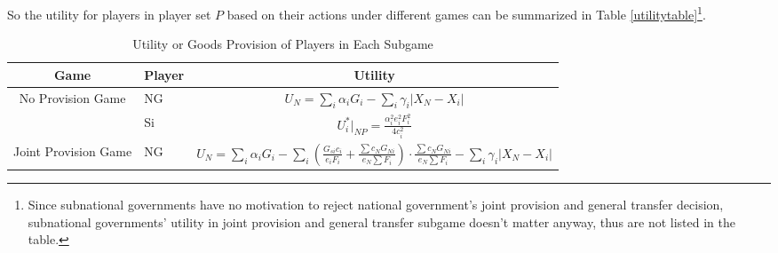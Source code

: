 \begin{itemize}
So the utility for players in player set $P$ based on their actions under different games can be summarized in Table \ref{utilitytable}\footnote{Since subnational governments have no motivation to reject national government's joint provision and general transfer decision, subnational governments' utility in joint provision and general transfer subgame doesn't matter anyway, thus are not listed in the table.}.
\begin{table}[htbp]
    \centering
    \caption{Utility or Goods Provision of Players in Each Subgame}
    \begin{tabular}{clc}
        \toprule
        \multicolumn{1}{p{11.645em}}{Game}                         & \multicolumn{1}{p{2.855em}}{Player}        & \multicolumn{1}{p{16.57em}}{Utility}                                                                                                                                       \\
        \midrule
        \multicolumn{1}{c}{\multirow{3}[4]{*}{No Provision Game }} & \multicolumn{1}{p{2.855em}}{NG}            & $U_N=\sum_i\alpha_i G_i-\sum_i \gamma_i |X_N-X_i|$                                                                                                                         \\
        \cmidrule{2-3}                                             & \multicolumn{1}{l}{\multirow{2}[2]{*}{Si}} & \multirow{2}[2]{*}{ $U_i^*|_{NP}=\frac{\alpha_i^2 e_i^2 F_i^2}{4c_i^2}$}                                                                                                   \\
                                                                   &                                            &                                                                                                                                                                            \\
        \midrule
        \multirow{3}[4]{*}{Joint Provision Game}                   & \multicolumn{1}{p{2.855em}}{NG}            & $ U_N= \sum_i \alpha_i G_i - \sum_i (\frac{G_{si} c_{i}}{e_i F_i}+\frac{\sum c_N G_{Ni}}{e_N\sum F_i })\cdot \frac{\sum c_N G_{Ni}}{e_N\sum F_i }
        -\sum_i \gamma_i |X_N-X_i| $                                                                                                                                                                                                                                                         \\

\end{tabular}
\end{table}
\end{itemize}
